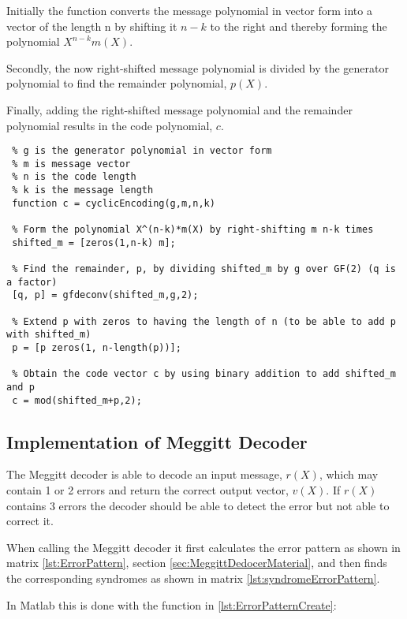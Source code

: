 \documentclass[Main]{subfiles}
\begin{document}
Initially the function converts the message polynomial in vector form into a vector of the length n by shifting it $n-k$ to the right and thereby forming the polynomial $X^{n-k}m(X)$. 

Secondly, the now right-shifted message polynomial is divided by the generator polynomial to find the remainder polynomial, $p(X)$.

Finally, adding the right-shifted message polynomial and the remainder polynomial results in the code polynomial, $c$.  

\begin{lstlisting}[caption=Cyclic Encoder, style=Code-Matlab, label=lst:refID]
 % cyclicEncoding is a function that encodes a message vector into systematic code given the following parameters
 % g is the generator polynomial in vector form
 % m is message vector
 % n is the code length
 % k is the message length
 function c = cyclicEncoding(g,m,n,k)

 % Form the polynomial X^(n-k)*m(X) by right-shifting m n-k times 
 shifted_m = [zeros(1,n-k) m];

 % Find the remainder, p, by dividing shifted_m by g over GF(2) (q is a factor)
 [q, p] = gfdeconv(shifted_m,g,2);

 % Extend p with zeros to having the length of n (to be able to add p with shifted_m)
 p = [p zeros(1, n-length(p))];

 % Obtain the code vector c by using binary addition to add shifted_m and p 
 c = mod(shifted_m+p,2);
\end{lstlisting}







\subsection{Implementation of Meggitt Decoder}
\label{sec:ImplementMeggittDecoder}
The Meggitt decoder is able to decode an input message, $r(X)$, which may contain 1 or 2 errors and return the correct output vector, $v(X)$.
If $r(X)$ contains 3 errors the decoder should be able to detect the error but not able to correct it.

When calling the Meggitt decoder it first calculates the error pattern as shown in matrix \ref{lst:ErrorPattern}, section \ref{sec:MeggittDedocerMaterial}, and then finds the corresponding syndromes as shown in matrix \ref{lst:syndromeErrorPattern}.

In Matlab this is done with the function in \codeTitle \ref{lst:ErrorPatternCreate}:
\end{document}
